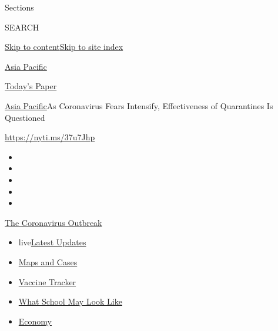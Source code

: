 Sections

SEARCH

\protect\hyperlink{site-content}{Skip to
content}\protect\hyperlink{site-index}{Skip to site index}

\href{https://www.nytimes.com/section/world/asia}{Asia Pacific}

\href{https://myaccount.nytimes.com/auth/login?response_type=cookie\&client_id=vi}{}

\href{https://www.nytimes.com/section/todayspaper}{Today's Paper}

\href{/section/world/asia}{Asia Pacific}\textbar{}As Coronavirus Fears
Intensify, Effectiveness of Quarantines Is Questioned

\url{https://nyti.ms/37u7Jhp}

\begin{itemize}
\item
\item
\item
\item
\item
\end{itemize}

\href{https://www.nytimes.com/news-event/coronavirus?action=click\&pgtype=Article\&state=default\&region=TOP_BANNER\&context=storylines_menu}{The
Coronavirus Outbreak}

\begin{itemize}
\tightlist
\item
  live\href{https://www.nytimes.com/2020/08/02/world/coronavirus-updates.html?action=click\&pgtype=Article\&state=default\&region=TOP_BANNER\&context=storylines_menu}{Latest
  Updates}
\item
  \href{https://www.nytimes.com/interactive/2020/us/coronavirus-us-cases.html?action=click\&pgtype=Article\&state=default\&region=TOP_BANNER\&context=storylines_menu}{Maps
  and Cases}
\item
  \href{https://www.nytimes.com/interactive/2020/science/coronavirus-vaccine-tracker.html?action=click\&pgtype=Article\&state=default\&region=TOP_BANNER\&context=storylines_menu}{Vaccine
  Tracker}
\item
  \href{https://www.nytimes.com/interactive/2020/07/29/us/schools-reopening-coronavirus.html?action=click\&pgtype=Article\&state=default\&region=TOP_BANNER\&context=storylines_menu}{What
  School May Look Like}
\item
  \href{https://www.nytimes.com/live/2020/07/31/business/stock-market-today-coronavirus?action=click\&pgtype=Article\&state=default\&region=TOP_BANNER\&context=storylines_menu}{Economy}
\end{itemize}

